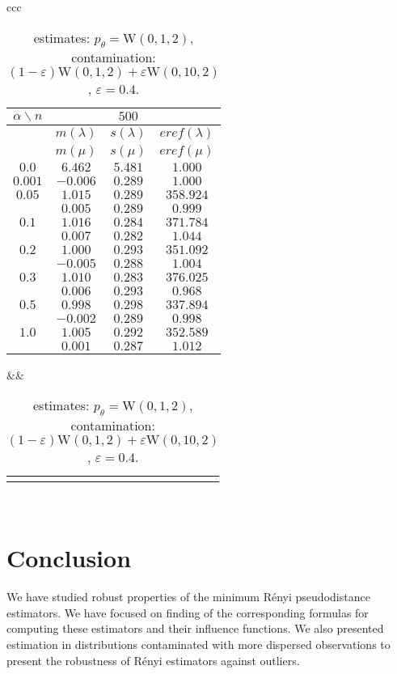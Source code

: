 {\begin{table}[htb] \footnotesize
\begin{center}
\begin{tabular}{ccc}
	\begin{tabular}{|c|ccc|}
	\hline
	$\alpha\backslash n$ &&  $500$ & \\
	\hline
	& $m(\lambda)$ & $s(\lambda)$ & $eref(\lambda)$ \\
	& $m(\mu)$ & $s(\mu)$ & $eref(\mu)$ \\
	\hline
	$0.0$ & $ 6.462 $ & $ 5.481 $ & $ 1.000 $\\
	$0.001$ & $ -0.006 $ & $ 0.289 $ & $ 1.000 $\\
	\hline
	$0.05$ & $ 1.015 $ & $ 0.289 $ & $ 358.924 $\\
	 & $ 0.005 $ & $ 0.289 $ & $ 0.999 $\\
	\hline
	$0.1$ & $ 1.016 $ & $ 0.284 $ & $ 371.784 $\\
	& $ 0.007 $ & $ 0.282 $ & $ 1.044 $\\
	\hline
	$0.2$ & $ 1.000 $ & $ 0.293 $ & $ 351.092 $\\
	& $ -0.005 $ & $ 0.288 $ & $ 1.004 $\\
	\hline
	$0.3$ & $ 1.010 $ & $ 0.283 $ & $ 376.025 $\\
	 & $ 0.006 $ & $ 0.293 $ & $ 0.968 $\\
	\hline
	$0.5$ & $ 0.998 $ & $ 0.298 $ & $ 337.894 $\\
	 & $ -0.002 $ & $ 0.289 $ & $ 0.998 $\\
	\hline
	$1.0$ & $ 1.005 $ & $ 0.292 $ & $ 352.589 $\\
	 & $ 0.001 $ & $ 0.287 $ & $ 1.012 $\\
	\hline
	\end{tabular}
&&
	\begin{tabular}{c}
		\epsfig{file=Weibull-e04-eref.eps, height=2.5in}
	\end{tabular}
\\
\end{tabular}
\end{center}
\caption{\R estimates: $p_\theta = \mathrm{W}(0,1,2)$, contamination: $(1-\varepsilon)\mathrm{W}(0,1,2) + \varepsilon \mathrm{W}(0,10,2)$, $\varepsilon =  0.4$.}
\label{tabJK:weibull-eref}
\end{table}


\section{Conclusion}
We have studied robust properties of the minimum R\'enyi pseudodistance estimators. We have focused on finding of the corresponding formulas for computing these estimators and their influence functions. We also presented estimation in distributions contaminated with more dispersed observations to present the robustness of R\'enyi estimators against outliers.

}
